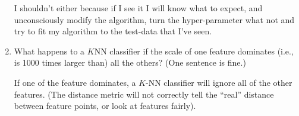 \documentclass[fleqn]{article}
\begin{document}
\begin{enumerate}
\begin{solution}
  I shouldn't either because if I see it I will know what to expect,
  and unconsciously modify the algorithm,
  turn the hyper-parameter what not and try to fit my algorithm to the
  test-data that I've seen.
\end{solution}  

\item What happens to a $K$NN classifier if the scale of one feature
  dominates (i.e., is 1000 times larger than) all the others?  (One
  sentence is fine.)

\begin{solution}
  If one of the feature dominates, a $K$-NN classifier will ignore all
  of the other features. (The distance metric will not correctly
  tell the ``real'' distance between feature points, or look at
  features fairly).
\end{solution}  

\end{enumerate}
\end{document}
